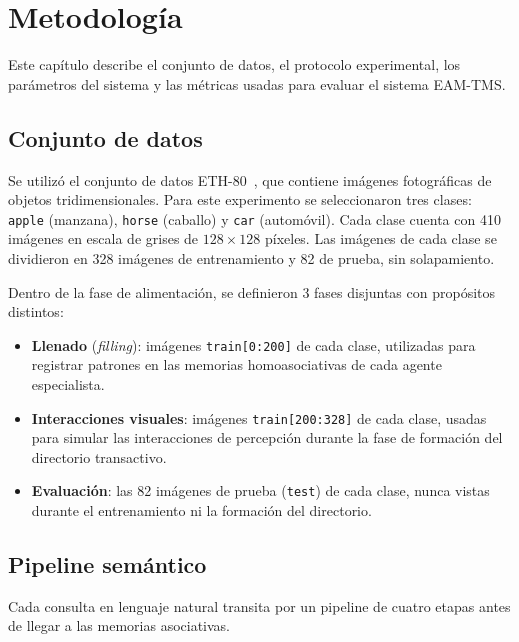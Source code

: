 \section{Metodología}
\label{sec:metodologia}

Este capítulo describe el conjunto de datos, el protocolo experimental, los parámetros del sistema y las métricas usadas para evaluar el sistema EAM-TMS.

\subsection{Conjunto de datos}
\label{sec:dataset}

Se utilizó el conjunto de datos ETH-80~\cite{leibe2003eth80}, que contiene imágenes fotográficas de objetos tridimensionales.
Para este experimento se seleccionaron tres clases: \texttt{apple} (manzana), \texttt{horse} (caballo) y \texttt{car} (automóvil).
Cada clase cuenta con 410 imágenes en escala de grises de $128\times128$ píxeles.
Las imágenes de cada clase se dividieron en 328 imágenes de entrenamiento y 82 de prueba, sin solapamiento.

Dentro de la fase de alimentación, se definieron 3 fases disjuntas con propósitos distintos:
\begin{itemize}
    \item \textbf{Llenado} (\textit{filling}): imágenes \texttt{train[0:200]} de cada clase, utilizadas para registrar patrones en las memorias homoasociativas de cada agente especialista.
    \item \textbf{Interacciones visuales}: imágenes \texttt{train[200:328]} de cada clase, usadas para simular las interacciones de percepción durante la fase de formación del directorio transactivo.
    \item \textbf{Evaluación}: las 82 imágenes de prueba (\texttt{test}) de cada clase, nunca vistas durante el entrenamiento ni la formación del directorio.
\end{itemize}

\subsection{Pipeline semántico}
\label{sec:pipeline-semantico}

Cada consulta en lenguaje natural transita por un pipeline de cuatro etapas antes de llegar a las memorias asociativas.

